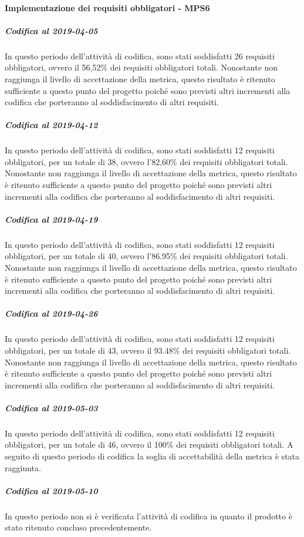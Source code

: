\paragraph{Implementazione dei requisiti obbligatori - MPS6}
\subparagraph{Codifica al 2019-04-05}
In questo periodo dell'attività di codifica, sono stati soddisfatti 26 requisiti obbligatori, ovvero il 56,52\% dei requisiti obbligatori totali.
Nonostante non raggiunga il livello di accettazione della
metrica, questo risultato è ritenuto sufficiente a questo punto del progetto poiché sono previsti altri incrementi alla codifica che porteranno al soddisfacimento di altri requisiti.

\subparagraph{Codifica al 2019-04-12}
In questo periodo dell'attività di codifica, sono stati soddisfatti 12 requisiti obbligatori, per un totale di 38, ovvero l'82,60\% dei requisiti obbligatori totali.
Nonostante non raggiunga il livello di accettazione della
metrica, questo risultato è ritenuto sufficiente a questo punto del progetto poiché sono previsti altri incrementi alla codifica che porteranno al soddisfacimento di altri requisiti.

\subparagraph{Codifica al 2019-04-19}
In questo periodo dell'attività di codifica, sono stati soddisfatti 12 requisiti obbligatori, per un totale di 40, ovvero l'86.95\% dei requisiti obbligatori totali.
Nonostante non raggiunga il livello di accettazione della
metrica, questo risultato è ritenuto sufficiente a questo punto del progetto poiché sono previsti altri incrementi alla codifica che porteranno al soddisfacimento di altri requisiti.

\subparagraph{Codifica al 2019-04-26}
In questo periodo dell'attività di codifica, sono stati soddisfatti 12 requisiti obbligatori, per un totale di 43, ovvero il 93.48\% dei requisiti obbligatori totali.
Nonostante non raggiunga il livello di accettazione della
metrica, questo risultato è ritenuto sufficiente a questo punto del progetto poiché sono previsti altri incrementi alla codifica che porteranno al soddisfacimento di altri requisiti.

\subparagraph{Codifica al 2019-05-03}
In questo periodo dell'attività di codifica, sono stati soddisfatti 12 requisiti obbligatori, per un totale di 46, ovvero il 100\% dei requisiti obbligatori totali.
A seguito di questo periodo di codifica la soglia di accettabilità della metrica è stata raggiunta.

\subparagraph{Codifica al 2019-05-10}
In questo periodo non si è verificata l'attività di codifica in quanto il prodotto è stato ritenuto concluso precedentemente.

